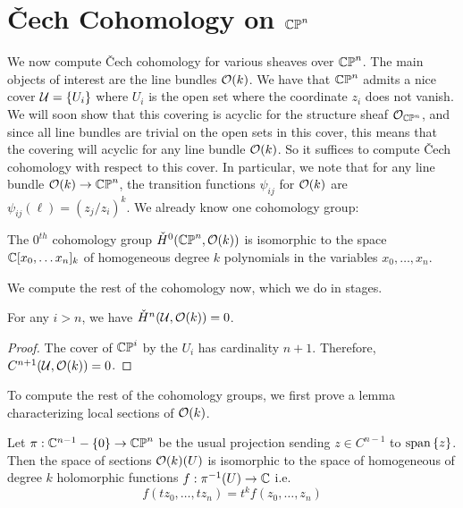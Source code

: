 %
\section{\v{C}ech Cohomology on $\mathbb{CP}^n$}
%
We now compute \v{C}ech cohomology for various sheaves over $\mathbb{CP}^n$. The main objects
of interest are the line bundles $\mathcal{O}(k)$. We have that $\mathbb{CP}^n$ admits a nice cover
$\mathcal{U} = \left\lbrace U_i \right\rbrace$ where $U_i$ is the open set where the coordinate $z_i$ does not
vanish. We will soon show that this covering is acyclic for the structure sheaf
$\mathcal{O}_{\mathbb{CP}^n}$, and since all line bundles are trivial on the open sets in this cover, this
means that the covering will acyclic for any line bundle $\mathcal{O}(k)$. So it suffices to
compute \v{C}ech cohomology with respect to this cover. In particular, we note that for
any line bundle $\mathcal{O}(k) \to \mathbb{CP}^n$, the transition functions $\psi_{ij}$ for $\mathcal{O}(k)$
are $\psi_{ij}(\ell) = (z_j/z_i)^k$. We already know one cohomology group:
%
\begin{thm}
The $0^{th}$ cohomology group $\check{H}^0(\mathbb{CP}^n, \mathcal{O}(k))$ is isomorphic to the space
$\mathbb{C}[x_0, \ldots x_n]_k$ of homogeneous degree $k$ polynomials in the variables
$x_0, \ldots , x_n$.
\end{thm}
%
We compute the rest of the cohomology now, which we do in stages.
%
\begin{thm}
For any $i > n$, we have $\check{H}^n(\mathcal{U},\mathcal{O}(k)) = 0$.
\end{thm}
%
\begin{proof}
The cover of $\mathbb{CP}^i$ by the $U_i$ has cardinality $n+1$. Therefore,
$C^{n+1}(\mathcal{U}, \mathcal{O}(k)) = 0$.
\end{proof}
%
To compute the rest of the cohomology groups, we first prove a lemma characterizing
local sections of $\mathcal{O}(k)$.
%
\begin{lem}
Let $\pi : \mathbb{C}^{n-1} - \left\lbrace 0 \right\rbrace \to \mathbb{CP}^n$ be the usual projection sending
$z \in C^{n-1}$ to $\mathrm{span}\left\lbrace z \right\rbrace$. Then the space of sections
$\mathcal{O}(k)(U)$ is isomorphic to the space of homogeneous of degree $k$  holomorphic functions
$f : \pi^{-1}(U) \to \mathbb{C}$ i.e.
\[
f(tz_0, \ldots, tz_n) = t^kf(z_0,\ldots, z_n)
\]
\end{lem}
%
